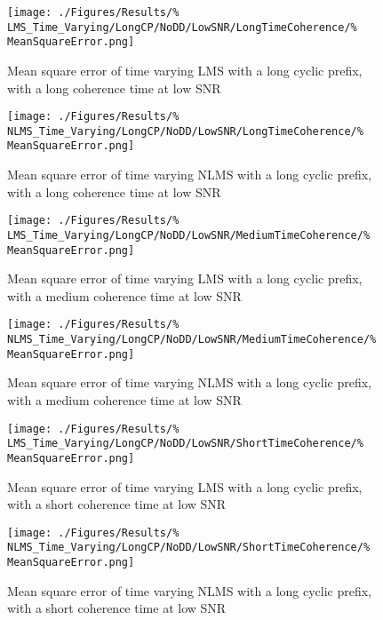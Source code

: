 \begin{figure}[ht]
	\centering
	\begin{minipage}{0.49\textwidth}
		\centering
		\texttt{[image: ./Figures/Results/\%
	LMS\_Time\_Varying/LongCP/NoDD/LowSNR/LongTimeCoherence/\%
	MeanSquareError.png]}
		\captionsetup{width=0.75\linewidth}
		\caption{Mean square error of time varying LMS with a 
		long cyclic prefix, with a long coherence time at 
		low SNR}
	\end{minipage}
	\begin{minipage}{0.49\textwidth}
		\centering
		\texttt{[image: ./Figures/Results/\%
	NLMS\_Time\_Varying/LongCP/NoDD/LowSNR/LongTimeCoherence/\%
	MeanSquareError.png]}
		\captionsetup{width=0.75\linewidth}
		\caption{Mean square error of time varying NLMS with 
		a long cyclic prefix, with a long coherence time 
		at low SNR}
		\label{fig:NLMS-Long-Low-None-Long}
	\end{minipage}
\end{figure}

\begin{figure}[ht]
	\centering
	\begin{minipage}{0.49\textwidth}
		\centering
		\texttt{[image: ./Figures/Results/\%
	LMS\_Time\_Varying/LongCP/NoDD/LowSNR/MediumTimeCoherence/\%
	MeanSquareError.png]}
		\captionsetup{width=0.75\linewidth}
		\caption{Mean square error of time varying LMS with a 
		long cyclic prefix, with a medium coherence time at 
		low SNR}
	\end{minipage}
	\begin{minipage}{0.49\textwidth}
		\centering
		\texttt{[image: ./Figures/Results/\%
	NLMS\_Time\_Varying/LongCP/NoDD/LowSNR/MediumTimeCoherence/\%
	MeanSquareError.png]}
		\captionsetup{width=0.75\linewidth}
		\caption{Mean square error of time varying NLMS with 
		a long cyclic prefix, with a medium coherence time 
		at low SNR}
	\end{minipage}
\end{figure}

\begin{figure}[ht]
	\centering
	\begin{minipage}{0.49\textwidth}
		\centering
		\texttt{[image: ./Figures/Results/\%
	LMS\_Time\_Varying/LongCP/NoDD/LowSNR/ShortTimeCoherence/\%
	MeanSquareError.png]}
		\captionsetup{width=0.75\linewidth}
		\caption{Mean square error of time varying LMS with a 
		long cyclic prefix, with a short coherence time at 
		low SNR}
	\end{minipage}
	\begin{minipage}{0.49\textwidth}
		\centering
		\texttt{[image: ./Figures/Results/\%
	NLMS\_Time\_Varying/LongCP/NoDD/LowSNR/ShortTimeCoherence/\%
	MeanSquareError.png]}
		\captionsetup{width=0.75\linewidth}
		\caption{Mean square error of time varying NLMS with 
		a long cyclic prefix, with a short coherence time at 
		low SNR}
	\end{minipage}
\end{figure}

